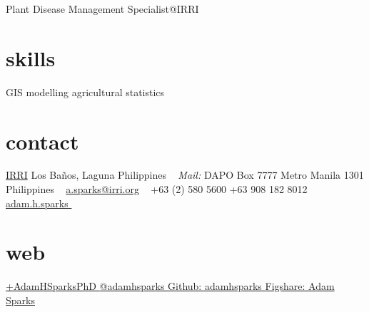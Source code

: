 
       {Plant Disease Management Specialist@IRRI}


\begin{aside}
\section{skills}
\small{GIS
modelling
agricultural statistics
~
\section{contact}
\href{http://www.irri.org/}{IRRI}
Los Ba\~nos, Laguna
Philippines
~
\emph{Mail:}
DAPO Box 7777
Metro Manila
1301 Philippines
~
\href{mailto:a.sparks@irri.org}{a.sparks@irri.org}
~
+63 (2) 580 5600 \faPhone
+63 908 182 8012  \faMobilePhone
{\href{skype:adam.h.sparks?call}{adam.h.sparks }}
~
\section{web}
\href{https://plus.google.com/+AdamHSparksPhD}{+AdamHSparksPhD {\color{google.plus}\faGooglePlusSign}}
\href{https://www.twitter.com/adamhsparks/}{@adamhsparks {\color{twitter.blue}\faTwitter}}
\href{https://github.com/adamhsparks/}{Github: adamhsparks \faGithub}
\href{http://figshare.com/authors/Adam_Sparks/535457}{Figshare: Adam Sparks}}
\end{aside}

